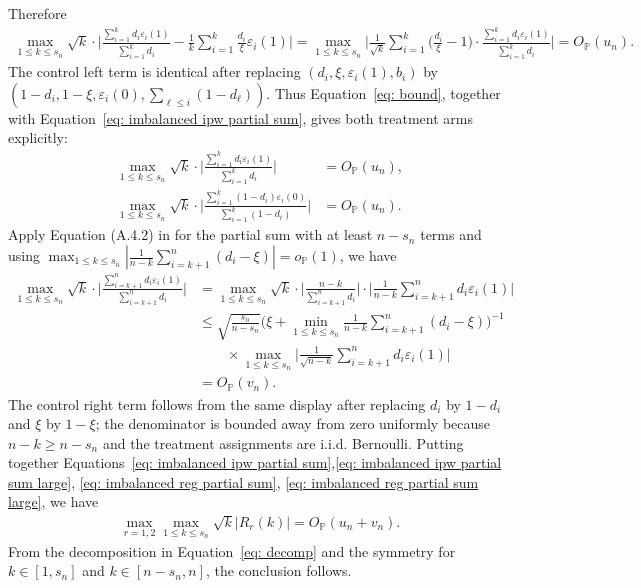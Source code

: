 \documentclass[10pt]{article}
\def\P{\mathbb{P}}
\theoremstyle{definition}
\theoremstyle{remark}
\begin{document}
Therefore
\begin{align}\label{eq: bound}
    \max_{1 \leq k \leq s_n} \sqrt{k} \cdot\bigg|\frac{\sum_{i = 1}^k d_i \varepsilon_i(1)}{\sum_{i = 1}^k d_i} - \frac{1}{k}\sum_{i = 1}^k \frac{d_i}{\xi} \varepsilon_i(1)\bigg| 
    = \max_{1 \leq k \leq s_n} \bigg|\frac{1}{\sqrt{k}} \sum_{i = 1}^k \Big(\frac{d_i}{\xi} - 1 \Big) \cdot \frac{\sum_{i = 1}^k d_i \varepsilon_i(1)}{\sum_{i = 1}^k d_i} \bigg| = O_\P (u_n).
\end{align}
The control left term is identical after replacing $(d_i,\xi,\varepsilon_i(1),b_i)$ by $(1-d_i,1-\xi,\varepsilon_i(0),\sum_{\ell\leq i}(1-d_\ell))$. Thus Equation~\eqref{eq: bound}, together with Equation~\eqref{eq: imbalanced ipw partial sum}, gives both treatment arms explicitly:
\begin{align}
    \nonumber
    \max_{1 \leq k \leq s_n} \sqrt{k} \cdot
    \bigg|\frac{\sum_{i = 1}^k d_i \varepsilon_i(1)}{\sum_{i = 1}^k d_i}\bigg|
    & = O_\P(u_n), \\
    \max_{1 \leq k \leq s_n} \sqrt{k} \cdot
    \bigg|\frac{\sum_{i = 1}^k (1 - d_i) \varepsilon_i(0)}{\sum_{i = 1}^k (1 - d_i)}\bigg|
    & = O_\P(u_n). \label{eq: imbalanced reg partial sum}
\end{align}
Apply Equation (A.4.2) in \cite{csorgo1997limit} for the partial sum with at least $n - s_n$ terms and using $\max_{1 \leq k \leq s_n}|\frac{1}{n - k}\sum_{i = k+1}^n (d_i - \xi)| = o_\P(1)$, we have
\begin{align}
    \nonumber \max_{1 \leq k \leq s_n} \sqrt{k} \cdot \bigg|\frac{\sum_{i = k+1}^n d_i\varepsilon_i(1)}{\sum_{i = k+1}^n d_i}\bigg|
    & =  \max_{1 \leq k \leq s_n} \sqrt{k} \cdot \bigg|\frac{n - k}{\sum_{i = k+1}^n d_i} \bigg|\cdot \bigg|\frac{1}{n - k} \sum_{i = k+1}^n d_i \varepsilon_i(1)\bigg| \\
    \nonumber & \leq \sqrt{\frac{s_n}{n - s_n}}
    \bigg(\xi + \min_{1 \leq k \leq s_n}\frac{1}{n - k}
    \sum_{i = k+1}^n (d_i - \xi)\bigg)^{-1} \\
    \nonumber & \qquad \times
    \max_{1 \leq k \leq s_n}
    \bigg|\frac{1}{\sqrt{n - k}} \sum_{i = k+1}^n d_i \varepsilon_i(1)\bigg| \\
    & = O_\P (v_n). \label{eq: imbalanced reg partial sum large}
\end{align}
The control right term follows from the same display after replacing $d_i$ by $1-d_i$ and $\xi$ by $1-\xi$; the denominator is bounded away from zero uniformly because $n-k\geq n-s_n$ and the treatment assignments are i.i.d. Bernoulli. Putting together Equations~\eqref{eq: imbalanced ipw partial sum},\eqref{eq: imbalanced ipw partial sum large}, \eqref{eq: imbalanced reg partial sum}, \eqref{eq: imbalanced reg partial sum large}, we have
\begin{align*}
    \max_{r = 1,2}\max_{1 \leq k \leq s_n} \sqrt{k} |R_r(k)| = O_\P (u_n + v_n).
\end{align*}
From the decomposition in Equation~\eqref{eq: decomp} and the symmetry for $k \in [1,s_n]$ and $k \in [n - s_n,n]$, the conclusion follows.
\end{document}
